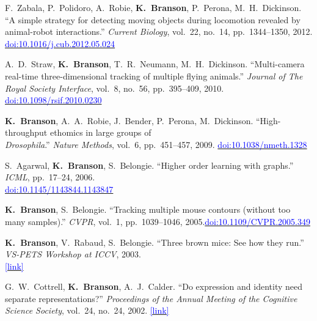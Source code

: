 \begin{cvenum}
\item F.~Zabala, P.~Polidoro, A.~Robie, {\bf K.~Branson}, P.~Perona, M.~H.~Dickinson. ``A simple strategy for detecting moving objects during locomotion revealed by animal-robot interactions.'' {\em Current Biology}, vol.~22, no.~14, pp.~1344--1350, 2012. \href{https://doi.org/10.1016/j.cub.2012.05.024}{\small\textcolor{blue}{doi:10.1016/j.cub.2012.05.024}}

\item A.~D.~Straw, {\bf K.~Branson}, T.~R.~Neumann, M.~H.~Dickinson. ``Multi-camera real-time three-dimensional tracking of multiple flying animals.'' {\em Journal of The Royal Society Interface}, vol.~8, no.~56, pp.~395--409, 2010.\\\href{https://doi.org/10.1098/rsif.2010.0230}{\small\textcolor{blue}{doi:10.1098/rsif.2010.0230}}

\item {\bf K.~Branson}, A.~A.~Robie, J.~Bender, P.~Perona, M.~Dickinson. ``High-throughput ethomics in large groups of\\{\em {D}rosophila}.'' {\em Nature Methods}, vol.~6, pp.~451--457, 2009. \href{https://doi.org/10.1038/nmeth.1328}{\small\textcolor{blue}{doi:10.1038/nmeth.1328}}

\item S.~Agarwal, {\bf K.~Branson}, S.~Belongie. ``Higher order learning with graphs.'' {\em ICML}, pp.~17--24, 2006.\\\href{https://doi.org/10.1145/1143844.1143847}{\small\textcolor{blue}{doi:10.1145/1143844.1143847}}

\item {\bf K.~Branson}, S.~Belongie. ``Tracking multiple mouse contours (without too many samples).'' {\em CVPR}, vol.~1, pp.~1039--1046, 2005.\href{https://ieeexplore.ieee.org/document/1467381}{\small\textcolor{blue}{doi:10.1109/CVPR.2005.349}}

\item {\bf K.~Branson}, V.~Rabaud, S.~Belongie. ``Three brown mice: See how they run.'' {\em VS-PETS Workshop at ICCV}, 2003.\\\href{https://vision.ucsd.edu/sites/default/files/publications/pdfs/ThreeBrownMiceSeeHowTheyRun_VSPETS03.pdf}{\small\textcolor{blue}{[link]}}

\item G.~W.~Cottrell, {\bf K.~Branson}, A.~J.~Calder. ``Do expression and identity need separate representations?'' {\em Proceedings of the Annual Meeting of the Cognitive Science Society}, vol.~24, no.~24, 2002. \href{https://www.researchgate.net/publication/298357084_Do_Expression_and_Identity_Need_Separate_Representations}{\small\textcolor{blue}{[link]}}

\end{cvenum}